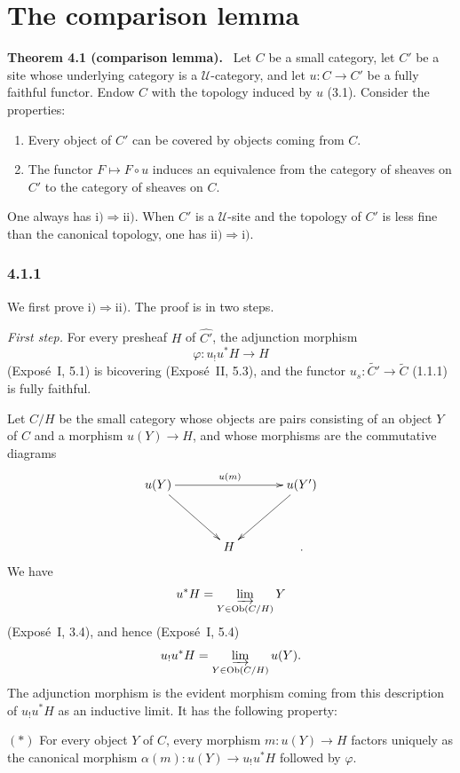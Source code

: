 \documentclass[11pt]{article}
\newcommand{\U}{\mathcal{U}}
\newcommand{\Ob}{\operatorname{Ob}}
\newenvironment{statement}[1]{\par\medskip\noindent\textbf{#1.}\ }{\par\medskip}
\begin{document}
\section{The comparison lemma}

\begin{statement}{Theorem 4.1 (comparison lemma)}
Let \(C\) be a small category, let \(C'\) be a site whose underlying category is a \(\U\)-category, and let \(u:C\to C'\) be a fully faithful functor. Endow \(C\) with the topology induced by \(u\) (3.1). Consider the properties:
\begin{enumerate}[label=\roman*)]
\item Every object of \(C'\) can be covered by objects coming from \(C\).
\item The functor \(F\mapsto F\circ u\) induces an equivalence from the category of sheaves on \(C'\) to the category of sheaves on \(C\).
\end{enumerate}
One always has \(\mathrm{i)}\Rightarrow\mathrm{ii)}\). When \(C'\) is a \(\U\)-site and the topology of \(C'\) is less fine than the canonical topology, one has \(\mathrm{ii)}\Rightarrow\mathrm{i)}\).
\end{statement}

\subsubsection*{4.1.1}
We first prove \(\mathrm{i)}\Rightarrow\mathrm{ii)}\). The proof is in two steps.

\emph{First step.} For every presheaf \(H\) of \(\widehat{C'}\), the adjunction morphism
\[
\varphi:u_!u^{\ast}H\to H
\]
(Expos\'e~I, 5.1) is bicov\-ering (Expos\'e~II, 5.3), and the functor \(u_s:\widetilde{C'}\to\widetilde C\) (1.1.1) is fully faithful.

Let \(C/H\) be the small category whose objects are pairs consisting of an object \(Y\) of \(C\) and a morphism \(u(Y)\to H\), and whose morphisms are the commutative diagrams
\[
\xymatrix@=1.25cm{
u(Y)\ar[rr]^{u(m)}\ar[rd]& &u(Y')\ar[ld]\\
& H& .
}
\]
We have
\[
u^{\ast}H=\varinjlim_{Y\in\Ob(C/H)}Y
\]
(Expos\'e~I, 3.4), and hence (Expos\'e~I, 5.4)
\[
u_!u^{\ast}H=\varinjlim_{Y\in\Ob(C/H)}u(Y).
\]
The adjunction morphism is the evident morphism coming from this description of \(u_!u^{\ast}H\) as an inductive limit. It has the following property:

\((*)\) For every object \(Y\) of \(C\), every morphism \(m:u(Y)\to H\) factors uniquely as the canonical morphism \(\alpha(m):u(Y)\to u_!u^{\ast}H\) followed by \(\varphi\).
\end{document}
